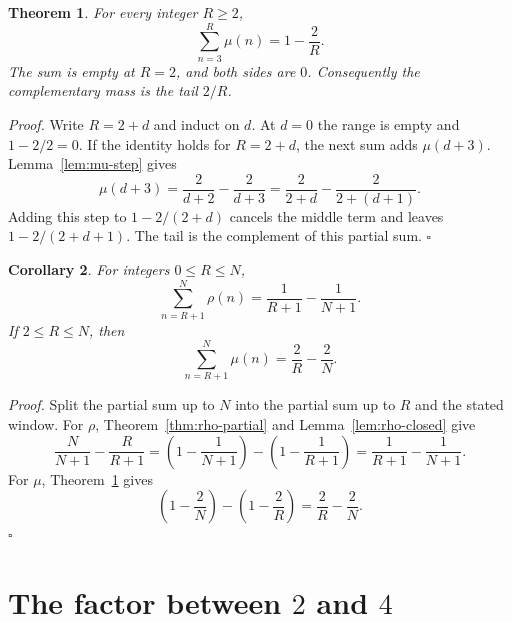 \documentclass[11pt,letterpaper]{article}
\newtheorem{theorem}{Theorem}
\newtheorem{corollary}[theorem]{Corollary}
\newenvironment{proof}{\noindent\textit{Proof.}}{\hfill\(\square\)}
\begin{document}
\begin{theorem}
\label{thm:mu-partial}
For every integer $R\ge 2$,
\begin{equation*}
\sum_{n=3}^{R}\mu(n)=1-\frac{2}{R}.
\end{equation*}
The sum is empty at $R=2$, and both sides are $0$. Consequently the complementary mass is the tail $2/R$.
\end{theorem}

\begin{proof}
Write $R=2+d$ and induct on $d$. At $d=0$ the range is empty and $1-2/2=0$. If the identity holds for $R=2+d$, the next sum adds $\mu(d+3)$. Lemma~\ref{lem:mu-step} gives
\begin{equation*}
\mu(d+3)=\frac{2}{d+2}-\frac{2}{d+3}=\frac{2}{2+d}-\frac{2}{2+(d+1)}.
\end{equation*}
Adding this step to $1-2/(2+d)$ cancels the middle term and leaves $1-2/(2+d+1)$. The tail is the complement of this partial sum.
\end{proof}

\begin{corollary}
\label{cor:windows}
For integers $0\le R\le N$,
\begin{equation*}
\sum_{n=R+1}^{N}\rho(n)=\frac{1}{R+1}-\frac{1}{N+1}.
\end{equation*}
If $2\le R\le N$, then
\begin{equation*}
\sum_{n=R+1}^{N}\mu(n)=\frac{2}{R}-\frac{2}{N}.
\end{equation*}
\end{corollary}

\begin{proof}
Split the partial sum up to $N$ into the partial sum up to $R$ and the stated window. For $\rho$, Theorem~\ref{thm:rho-partial} and Lemma~\ref{lem:rho-closed} give
\begin{equation*}
\frac{N}{N+1}-\frac{R}{R+1}
=\left(1-\frac{1}{N+1}\right)-\left(1-\frac{1}{R+1}\right)
=\frac{1}{R+1}-\frac{1}{N+1}.
\end{equation*}
For $\mu$, Theorem~\ref{thm:mu-partial} gives
\begin{equation*}
\left(1-\frac{2}{N}\right)-\left(1-\frac{2}{R}\right)=\frac{2}{R}-\frac{2}{N}.
\end{equation*}
\end{proof}

\section{The factor between $2$ and $4$}
\end{document}
